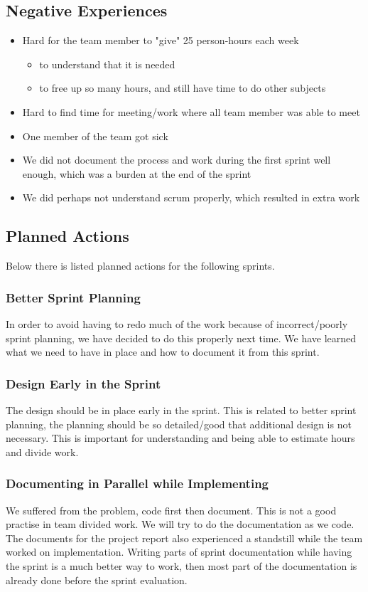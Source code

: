 \subsection{Negative Experiences}
\begin{itemize}
	\item Hard for the team member to "give" 25 person-hours each week
	\begin{itemize}
		\item to understand that it is needed
		\item to free up so many hours, and still have time to do other subjects
	\end{itemize}
	\item Hard to find time for meeting/work where all team member was able to meet
	\item One member of the team got sick
	\item We did not document the process and work during the first sprint well enough, which was a burden at the end of the sprint
	\item We did perhaps not understand \Gls{scrum} properly, which resulted in extra work
\end{itemize}

\subsection{Planned Actions}
Below there is listed planned actions for the following sprints.

\subsubsection{Better Sprint Planning}
In order to avoid having to redo much of the work because of incorrect/poorly
sprint planning, we have decided to do this properly next time. We have learned
what we need to have in place and how to document it from this sprint.

\subsubsection{Design Early in the Sprint} 
The design should be in place early in the sprint. This is related to better
sprint planning, the planning should be so detailed/good that additional design
is not necessary. This is important for understanding and being able to
estimate hours and divide work.

\subsubsection{Documenting in Parallel while Implementing}
We suffered from the problem, code first then document. This is not a good
practise in team divided work. We will try to do the documentation as we code.
The documents for the project report also experienced a standstill while the
team worked on implementation. Writing parts of sprint documentation while
having the sprint is a much better way to work, then most part of the
documentation is already done before the sprint evaluation.

